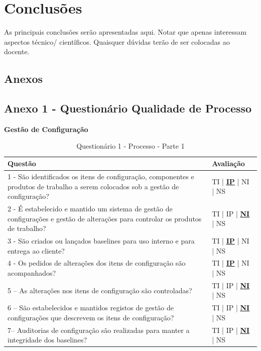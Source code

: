 \documentclass[openany,10pt,a4paper]{article}
\begin{document}
\section{Conclusões}


As principais conclusões serão apresentadas aqui. Notar que apenas interessam aspectos técnico/ científicos. Quaisquer dúvidas terão de ser colocadas ao docente.

\renewcommand\bibname{Referências} %
\setlength{\parskip}{0.7em}



\begin{appendix}

\section*{Anexos}\label{ConteudoAnexos}

\subsection{Anexo 1 - Questionário Qualidade de Processo}
\begin{table}[h]
	\textbf{Gestão de Configuração}
		\centering
		\caption{Questionário 1 - Processo - Parte 1}
		\begin{tabular}{p{5in}p{1in}}		
			\toprule
			\textbf{Questão}  & \textbf{Avaliação}\\ 
			\midrule
			1 - São identificados os itens de configuração, componentes e produtos de trabalho a serem 
	colocados sob a gestão de configuração?
	 & TI | \underline{\underline{\textbf{IP}}} | NI | NS \\
			\midrule
			2 - É estabelecido e mantido um sistema de gestão de configurações e gestão de alterações para 
	controlar os produtos de trabalho?
	 & TI | IP | \underline{\textbf{NI}} | NS \\
			\midrule
			3 -  São criados ou lançados baselines para uso interno e para entrega ao cliente?
	 & TI | \underline{\textbf{IP}} | NI | NS \\
			\midrule
			4 - Os pedidos de alterações dos itens de configuração são acompanhados?
	 & TI | \underline{\textbf{IP}} | NI | NS \\
			\midrule
			5 – As alterações nos itens de configuração são controladas?
	  & TI | IP | \underline{\textbf{NI}} | NS \\
			\midrule
			6 – São estabelecidos e mantidos registos de gestão de configurações que descrevem os itens 
	de configuração?
	 & TI | IP | \underline{\textbf{NI}} | NS \\
			\midrule
			7– Auditorias de configuração são realizadas para manter a integridade dos baselines?
	 & TI | IP | \underline{\textbf{NI}} | NS \\
			\bottomrule
		\end{tabular} 
	\end{table}
	

\end{appendix}
\end{document}
